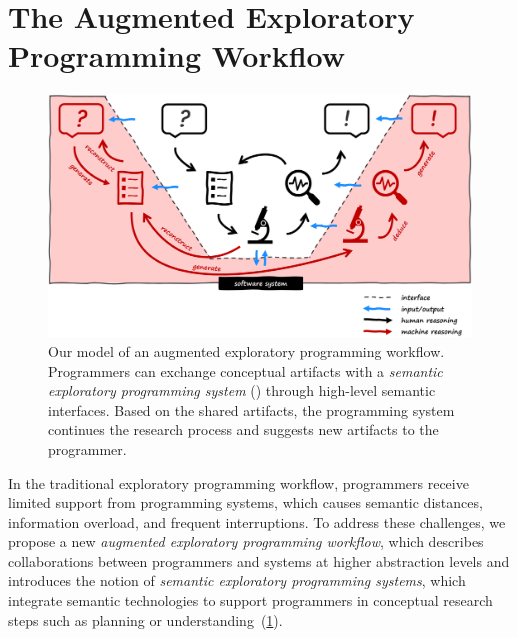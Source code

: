 
\section{The Augmented Exploratory Programming Workflow}
\label{sec:approach/workflow}

\begin{figure}
	\centering
	\includegraphics[width=\textwidth]{01_workflow/workflow.png}
	\caption[Our model of an \emph{augmented exploratory programming workflow}.]{
		Our model of an augmented exploratory programming workflow.
		Programmers can exchange conceptual artifacts with a \emph{semantic exploratory programming system} (\bold{\textcolor[HTML]{c00000}{red}}) through high-level semantic interfaces.
		Based on the shared artifacts, the programming system continues the research process and suggests new artifacts to the programmer.
	}
	\label{fig:approach/workflow/workflow}
\end{figure}

In the traditional exploratory programming workflow, programmers receive limited support from programming systems, which causes semantic distances, information overload, and frequent interruptions.
To address these challenges, we propose a new \emph{augmented exploratory programming workflow}, which describes collaborations between programmers and systems at higher abstraction levels and introduces the notion of \emph{semantic exploratory programming systems}, which integrate semantic technologies to support programmers in conceptual research steps such as planning or understanding~(\cref{fig:approach/workflow/workflow}).

